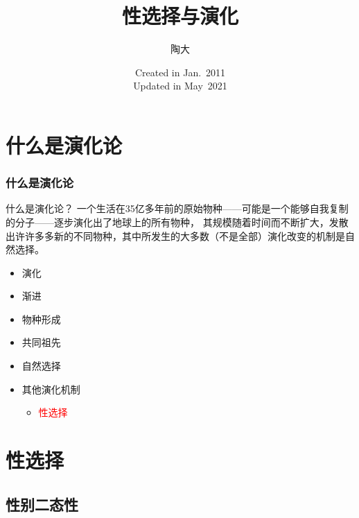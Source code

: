 \documentclass[UTF8,lualatex]{ctexbeamer}
\title{\kaishu 性选择与演化}
\author{陶大}
\institute{纳拓软件}
\date{\tiny
        Created in Jan.\ 2011\\
        Updated in May\ 2021}
\begin{document}
\songti
    
\begin{frame}
\titlepage
\end{frame}

\section{什么是演化论}

\begin{frame}
    \frametitle{什么是演化论}
    \begin{block}{什么是演化论？}
        一个生活在35亿多年前的原始物种——可能是一个能够自我复制的分子——逐步演化出了地球上的所有物种，
        其规模随着时间而不断扩大，发散出许许多多新的不同物种，其中所发生的大多数（不是全部）演化改变的机制是自然选择。
        \begin{itemize}
            \item<2-> 演化
            \item<2-> 渐进
            \item<2-> 物种形成
            \item<2-> 共同祖先
            \item<2-> 自然选择
            \item<2-> 其他演化机制
                \begin{itemize}
                    \item<3> \textcolor{red}{性选择}
                \end{itemize}
        \end{itemize}
    \end{block}
\end{frame}


\section{性选择}
\subsection{性别二态性}
\end{document}
